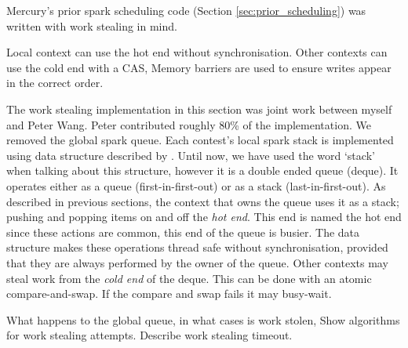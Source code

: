 Mercury's prior spark scheduling code (Section \ref{sec:prior_scheduling}) was
written with work stealing in mind.


Local context can use the hot end without synchronisation.
Other contexts can use the cold end with a CAS,
Memory barriers are used to ensure writes appear in the correct order.

The work stealing implementation in this section was joint work between
myself and Peter Wang.
Peter contributed roughly 80\% of the implementation.
We removed the global spark queue.
Each contest's local spark stack is implemented using data structure
described by \citet{workstealing_queue}.
Until now, we have used the word `stack' when talking about this
structure,
however it is a double ended queue (deque).
It operates either as a queue
(first-in-first-out) or as a stack (last-in-first-out).
As described in previous sections, the context that owns the queue uses
it as a stack;
pushing and popping items on and off the \emph{hot end}.
This end is named the hot end since these actions are common, this end
of the queue is busier.
The data structure makes these operations thread safe without
synchronisation,
provided that they are always performed by the owner of the queue.
Other contexts may steal work from the \emph{cold end} of the deque.
This can be done with an atomic compare-and-swap.
If the compare and swap fails it may busy-wait.


What happens to the global queue,
in what cases is work stolen,
Show algorithms for work stealing attempts.
Describe work stealing timeout.





